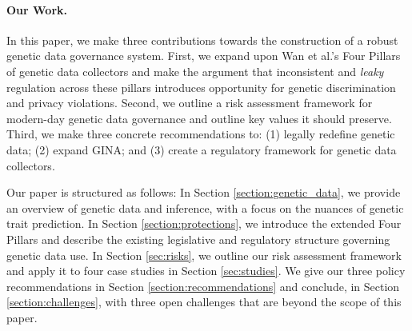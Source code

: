 \paragraph{Our Work.} In this paper, we make three contributions towards the construction of a robust genetic data governance system. First, we expand upon Wan et al.'s \cite{wan_sociotechnical_2022} Four Pillars of genetic data collectors and make the argument that inconsistent and \emph{leaky} regulation across these pillars introduces opportunity for genetic discrimination and privacy violations. Second, we outline a risk assessment framework for modern-day genetic data governance and outline key values it should preserve. Third, we make three concrete recommendations to: (1) legally redefine genetic data; (2) expand GINA; and (3) create a regulatory framework for genetic data collectors. 






Our paper is structured as follows: In Section \ref{section:genetic_data}, we provide an overview of genetic data and inference, with a focus on the nuances of genetic trait prediction. In Section \ref{section:protections}, we introduce the extended Four Pillars and describe the existing legislative and regulatory structure governing genetic data use. In Section \ref{sec:risks}, we outline our risk assessment framework and apply it to four case studies in Section \ref{sec:studies}. We give our three policy recommendations in Section \ref{section:recommendations} and conclude, in Section \ref{section:challenges}, with three open challenges that are beyond the scope of this paper. 
